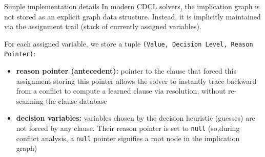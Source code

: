 \documentclass[a4paper, 11pt]{report}
\begin{document}
\begin{gframe}{Simple implementation details}
In modern CDCL solvers, the implication graph is not stored as an explicit graph data structure. Instead, it is implicitly maintained via the assignment trail (stack of currently assigned variables).

For each assigned variable, we store a tuple \texttt{(Value, Decision Level, Reason Pointer)}:
\begin{itemize}
    \item \textbf{reason pointer (antecedent):} pointer to the clause that forced this assignment
    \subitem storing this pointer allows the solver to instantly trace backward from a conflict to compute a learned clause via resolution, without re-scanning the clause database
    \item \textbf{decision variables:} variables chosen by the decision heuristic (guesses) are not forced by any clause. Their reason pointer is set to \texttt{null} (so,during conflict analysis, a \texttt{null} pointer signifies a root node in the implication graph)
\end{itemize}
\end{gframe}
\end{document}
